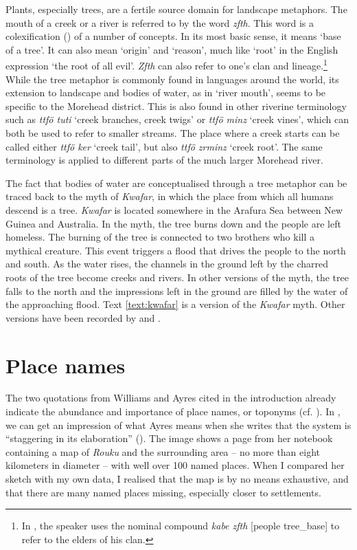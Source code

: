 Plants, especially trees, are a fertile source domain for landscape metaphors. The mouth of a creek or a river is referred to by the word \textit{zfth}. This word is a colexification (\cite{Francois:2008wc}) of a number of concepts. In its most basic sense, it means `base of a tree'. It can also mean `origin' and `reason’, much like `root' in the English expression `the root of all evil'. \textit{Zfth} can also refer to one's clan and lineage.\footnote{In , the speaker uses the nominal compound \textit{kabe zfth} [people tree\_base] to refer to the elders of his clan.} While the tree metaphor is commonly found in languages around the world, its extension to landscape and bodies of water, as in `river mouth', seems to be specific to the Morehead district. This is also found in other riverine terminology such as \textit{ttfö tuti} `creek branches, creek twigs’ or \textit{ttfö minz} `creek vines’, which can both be used to refer to smaller streams. The place where a creek starts can be called either \textit{ttfö ker} `creek tail’, but also \textit{ttfö zrminz} `creek root'. The same terminology is applied to different parts of the much larger Morehead river.

The fact that bodies of water are conceptualised through a tree metaphor can be traced back to the myth of \textit{Kwafar}, in which the place from which all humans descend is a tree. \textit{Kwafar} is located somewhere in the Arafura Sea between New Guinea and Australia. In the myth, the tree burns down and the people are left homeless. The burning of the tree is connected to two brothers who kill a mythical creature. This event triggers a flood that drives the people to the north and south. As the water rises, the channels in the ground left by the charred roots of the tree become creeks and rivers. In other versions of the myth, the tree falls to the north and the impressions left in the ground are filled by the water of the approaching flood. Text \ref{text:kwafar} is a version of the \textit{Kwafar} myth. Other versions have been recorded by \citet[306]{Williams:1936hb} and \citet[50]{Ayres:1983dw}.

\section{Place names}\label{sec:placenames}
The two quotations from Williams and Ayres cited in the introduction already indicate the abundance and importance of place names, or toponyms (cf. ). In , we can get an impression of what Ayres means when she writes that the system is ``staggering in its elaboration'' (\citeyear[38]{Ayres:1983dw}). The image shows a page from her notebook containing a map of \textit{Rouku} and the surrounding area -- no more than eight kilometers in diameter -- with well over 100 named places. When I compared her sketch with my own data, I realised that the map is by no means exhaustive, and that there are many named places missing, especially closer to settlements.

